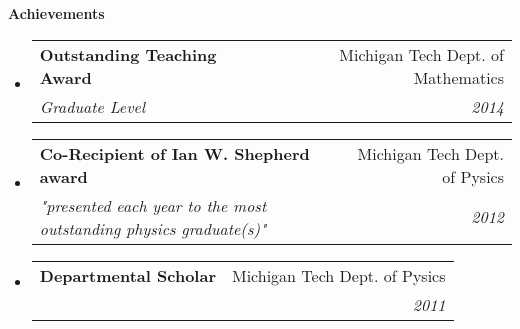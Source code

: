 \documentclass[letterpaper,11pt]{article}
\makeatletter
\newcommand{\resheading}[1]{{\large \textbf{#1}}}
\newcommand{\ressubheading}[4]{
\begin{tabular*}{6.5in}{l@{\extracolsep{\fill}}r}
		\textbf{#1} & #2 \\
		\textit{#3} & \textit{#4} \\
\end{tabular*}\vspace{-6pt}}
\makeatother
\begin{document}
\resheading{Achievements}
\begin{itemize}
\item
\ressubheading{Outstanding Teaching Award}{Michigan Tech Dept. of Mathematics}{Graduate Level}{2014}
\item
\ressubheading{Co-Recipient of Ian W. Shepherd award}{Michigan Tech Dept. of Pysics}{"presented each year to the most outstanding physics graduate(s)"}{2012}
\item
\ressubheading{Departmental Scholar}{Michigan Tech Dept. of Pysics}{}{2011}

\end{itemize}
\end{document}
